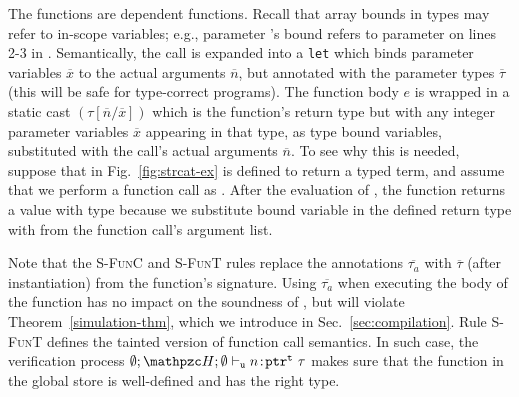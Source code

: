 The \systemname{} functions are dependent functions.
Recall that array
bounds in types may refer to in-scope variables; e.g., parameter
's bound  refers to parameter  on lines
2-3 in . 
Semantically,
the call is expanded into a \texttt{let} which binds
parameter variables $\overline{x}$ to the actual arguments
$\overline{n}$, but annotated with the parameter types
$\overline{\tau}$ (this will be safe for type-correct programs). 
The function body $e$ is wrapped in a static cast
$(\tau[\overline{n} / \overline{x}])$ which is the function's return
type but with any integer parameter variables $\overline{x}$ appearing in that
type, as type bound variables,
substituted with the call's actual arguments $\overline{n}$.
To see why this is needed, suppose that  in
Fig.~\ref{fig:strcat-ex} is defined to return a
 typed term, and assume that we
perform a  function call as
. After the evaluation of , the
function returns a value with type 
because we substitute bound variable  in the 
defined return type with  from the function call's
argument list.

Note that the \textsc{S-FunC} and \textsc{S-FunT} rules replace the
  annotations $\overline{\tau_a}$ with
  $\overline{\tau}$ (after instantiation) from the function's
  signature. Using $\overline{\tau_a}$ when executing the body of
the function has no impact on the soundness of \lang, but will violate
Theorem~\ref{simulation-thm}, which we introduce in Sec.~\ref{sec:compilation}.
Rule \textsc{S-FunT} defines the tainted version of function call semantics.
In such case, the verification process 
$\emptyset;\heap ; \emptyset \vdash_{\umode}\evalue{n}{\tptr{\tau}{\tmode}}$
makes sure that the function in the global store is well-defined and has the right type.



